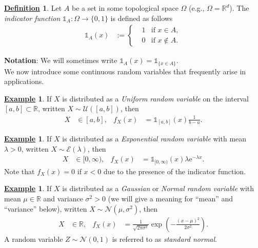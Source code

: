 \documentclass[12pt]{book}
\numberwithin{equation}{chapter}
\theoremstyle{plain}
\numberwithin{theorem}{section}
\theoremstyle{definition}
\newtheorem{definition}[theorem]{\underline{Definition}}
\newtheorem{example}[theorem]{\underline{Example}}
\numberwithin{exercise}{chapter}
\newcommand{\<}{\langle}
\renewcommand{\>}{\rangle}
\renewcommand{\(}{\left(}
\renewcommand{\)}{\right)}
\renewcommand{\[}{\left[}
\renewcommand{\]}{\right]}
\newcommand\Ib{\mathds{1}} 	%
\newcommand\Rb{\mathds{R}}
\newcommand\Ec{\mathscr{E}}
\newcommand\Nc{\mathscr{N}}
\newcommand\Uc{\mathscr{U}}
\newcommand\Om{\Omega}
\newcommand\sig{\sigma}
\newcommand\lam{\lambda}
\newcommand\ee{\mathrm{e}}
\begin{document}
\begin{definition}
Let $A$ be a set in some topological space $\Om$ (e.g., $\Om = \Rb^d$).  The \emph{indicator function} $\Ib_A : \Om \to \{0,1\}$ is defined as follows
\begin{align}
\Ib_A(x)
	&:= \left\{ \begin{aligned}
			&1 & \text{if $x \in A$}, \\
			&0 & \text{if $x \notin A$}.
			\end{aligned} \right.
\end{align}
\end{definition}

\noindent
\textbf{Notation}: We will sometimes write $\Ib_A(x) = \Ib_{\{ x \in A \}}$.
\\[0.5em]
We now introduce some continuous random variables that frequently arise in applications.

\begin{example}
\label{ex:uniform}
If $X$ is distributed as a \emph{Uniform random variable} on the interval $[a,b] \subset \Rb$, written $X \sim \Uc([a,b])$, then
\begin{align}
X
	&\in [a,b]  , &
f_X(x)
	&=	\Ib_{[a,b]}(x) \frac{1}{b-a}.
\end{align}
\end{example}

\begin{example}
\label{ex:exponential}
If $X$ is distributed as a \emph{Exponential random variable} with mean $\lam>0$, written $X \sim \Ec(\lam)$, then
\begin{align}
X
	&\in [0,\infty) , &
f_X(x)
	&=	\Ib_{[0,\infty)}(x) \lam \ee^{-\lam x} .
\end{align}
Note that $f_X(x) = 0$ if $x<0$ due to the presence of the indicator function.
\end{example}

\begin{example}
\label{ex:normal}
If $X$ is distributed as a \emph{Gaussian} or \emph{Normal random variable} with mean $\mu \in \Rb$ and variance $\sig^2>0$ (we will give a meaning for ``mean'' and ``variance'' below), written $X \sim \Nc(\mu,\sig^2)$, then
\begin{align}
X
	&\in \Rb , &
f_X(x)
	&=	\frac{1}{\sqrt{2 \pi \sig^2}}\exp\( - \frac{(x-\mu)^2}{2 \sig^2} \) .
\end{align}
A random variable $Z \sim \Nc(0,1)$ is referred to as \emph{standard normal}.
\end{example}
\end{document}
